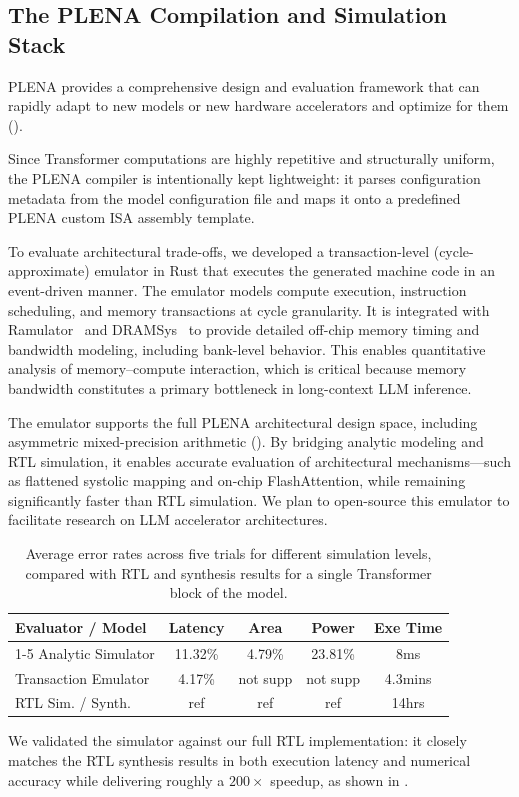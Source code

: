 \subsection{The PLENA Compilation and Simulation Stack}

PLENA provides a comprehensive design and evaluation framework that can rapidly adapt to new models or new hardware accelerators and optimize for them ().


Since Transformer computations are highly repetitive and structurally uniform, the PLENA compiler is intentionally kept lightweight: it parses configuration metadata from the model configuration file and maps it onto a predefined PLENA custom ISA assembly template.

To evaluate architectural trade-offs, we developed a transaction-level (cycle-approximate) emulator in Rust that executes the generated machine code in an event-driven manner. The emulator models compute execution, instruction scheduling, and memory transactions at cycle granularity. It is integrated with Ramulator~\cite{Ramulator} and DRAMSys~\cite{dramsys} to provide detailed off-chip memory timing and bandwidth modeling, including bank-level behavior. This enables quantitative analysis of memory–compute interaction, which is critical because memory bandwidth constitutes a primary bottleneck in long-context LLM inference.

The emulator supports the full PLENA architectural design space, including asymmetric mixed-precision arithmetic (). By bridging analytic modeling and RTL simulation, it enables accurate evaluation of architectural mechanisms—such as flattened systolic mapping and on-chip FlashAttention, while remaining significantly faster than RTL simulation. We plan to open-source this emulator to facilitate research on LLM accelerator architectures.


\begin{table}[!t]
\centering
\setlength{\tabcolsep}{3pt}
\renewcommand{\arraystretch}{1.15}
\caption{Average error rates across five trials for different simulation levels, compared with RTL and synthesis results for a single Transformer block of the \llamaIIIBig model.}
\begin{tabular}{lcccc}
\toprule
\textbf{Evaluator / Model} & \textbf{Latency} & \textbf{Area} & \textbf{Power} & \textbf{Exe Time} \\
\cmidrule(lr){1-5}
Analytic Simulator       & 11.32\% & 4.79\% & 23.81\% & 8ms \\
Transaction Emulator     & 4.17\% & not supp & not supp & 4.3mins\\
RTL Sim. / Synth.    & ref & ref & ref & 14hrs\\
\bottomrule
\end{tabular}
\label{tab:eval_models}
\vspace{-5pt}
\end{table}


We validated the simulator against our full RTL implementation: it closely matches the RTL synthesis results in both execution latency and numerical accuracy while delivering roughly a $200\times$ speedup, as shown in .



